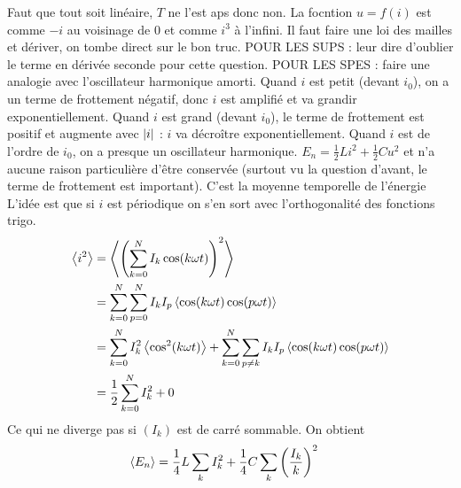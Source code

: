 \begin{solution}

\begin{questions}
    \questioncours Faut que tout soit linéaire, $T$ ne l'est aps donc non. 
    \question La focntion $u = f(i)$ est comme $-i$ au voisinage de 0 et comme $i^3$ à l'infini.
    \question Il faut faire une loi des mailles et dériver, on tombe direct sur le bon truc.
    \question POUR LES SUPS : leur dire d'oublier le terme en dérivée seconde pour cette question. POUR LES SPES : faire une analogie avec l'oscillateur harmonique amorti. Quand $i$ est petit (devant $i_0$), on a un terme de frottement négatif, donc $i$ est amplifié et va grandir exponentiellement. Quand $i$ est grand (devant $i_0$), le terme de frottement est positif et augmente avec $\abs{i}$ : $i$ va décroître exponentiellement. Quand $i$ est de l'ordre de $i_0$, on a presque un oscillateur harmonique.
    \question $E_n = \frac12 Li^2 + \frac12 Cu^2$ et n'a aucune raison particulière d'être conservée (surtout vu la question d'avant, le terme de frottement est important).
    \question C'est la moyenne temporelle de l'énergie
    \question L'idée est que si $i$ est périodique on s'en sort avec l'orthogonalité des fonctions trigo.
    \begin{align*}
        \ev{i^2} &= \ev{\qty(\sum_{k=0}^N I_k \cos(k\omega t))^2} \\
            &= \sum_{k=0}^N\sum_{p=0}^N I_k I_p \ev{\cos(k\omega t)\cos(p\omega t)} \\
         &= \sum_{k=0}^N I_k^2 \ev{\cos^2(k\omega t)} + \sum_{k=0}^N\sum_{p\neq k} I_k I_p \ev{\cos(k\omega t)\cos(p\omega t)} \\
        &= \frac12\sum_{k=0}^N I_k^2 + 0
    \end{align*}
    Ce qui ne diverge pas si $(I_k)$ est de carré sommable. On obtient 
    \begin{align*}
        \ev{E_n} &= \frac14 L \sum_k I_k^2 + \frac14 C \sum_k \qty(\frac{I_k}{k})^2
    \end{align*}
\end{questions}
\end{solution}